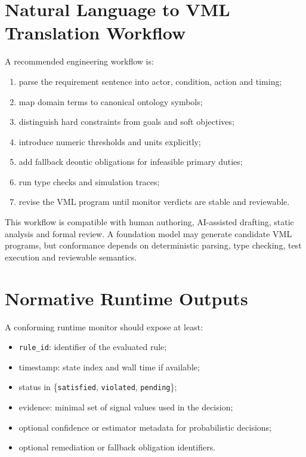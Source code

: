 \documentclass[11pt,a4paper]{article}
\newcommand{\VML}{\textsc{VML}}
\begin{document}
\section{Natural Language to \VML{} Translation Workflow}
A recommended engineering workflow is:
\begin{enumerate}
  \item parse the requirement sentence into actor, condition, action and timing;
  \item map domain terms to canonical ontology symbols;
  \item distinguish hard constraints from goals and soft objectives;
  \item introduce numeric thresholds and units explicitly;
  \item add fallback deontic obligations for infeasible primary duties;
  \item run type checks and simulation traces;
  \item revise the \VML{} program until monitor verdicts are stable and reviewable.
\end{enumerate}

This workflow is compatible with human authoring, AI-assisted drafting, static analysis and formal review. A foundation model may generate candidate \VML{} programs, but conformance depends on deterministic parsing, type checking, test execution and reviewable semantics.

\section{Normative Runtime Outputs}
A conforming runtime monitor should expose at least:
\begin{itemize}
  \item \texttt{rule\_id}: identifier of the evaluated rule;
  \item timestamp: state index and wall time if available;
  \item status in \{\texttt{satisfied}, \texttt{violated}, \texttt{pending}\};
  \item evidence: minimal set of signal values used in the decision;
  \item optional confidence or estimator metadata for probabilistic decisions;
  \item optional remediation or fallback obligation identifiers.
\end{itemize}
\end{document}
